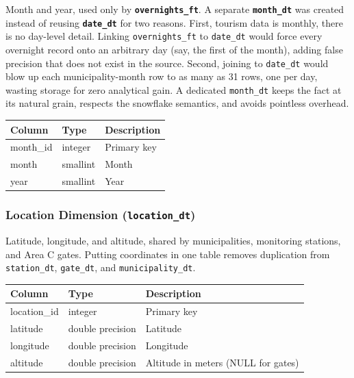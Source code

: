 \documentclass{article}
\begin{document}
	Month and year, used only by \textbf{\texttt{overnights\_ft}}.
	A separate \textbf{\texttt{month\_dt}} was created instead of reusing \textbf{\texttt{date\_dt}} for two reasons.
	First, tourism data is monthly, there is no day-level detail. Linking \texttt{overnights\_ft} to \texttt{date\_dt} would force every overnight record onto an arbitrary day (say, the first of the month), adding false precision that does not exist in the source.
	Second, joining to \texttt{date\_dt} would blow up each municipality-month row to as many as 31 rows, one per day, wasting storage for zero analytical gain.
	A dedicated \texttt{month\_dt} keeps the fact at its natural grain, respects the snowflake semantics, and avoids pointless overhead.

	\begin{table}[H]
		\centering
		\begin{tabular}{lll}
			\hline
			Column & Type & Description \\
			\hline
			month\_id & integer & Primary key \\
			month & smallint & Month \\
			year & smallint & Year \\
			\hline
		\end{tabular}
	\end{table}
	
	\subsubsection{Location Dimension (\textbf{\texttt{location\_dt}})}
	
	Latitude, longitude, and altitude, shared by municipalities, monitoring stations, and Area C gates. Putting coordinates in one table removes duplication from \texttt{station\_dt}, \texttt{gate\_dt}, and \texttt{municipality\_dt}.
	\begin{table}[H]
		\centering
		\begin{tabular}{lll}
			\hline
			Column & Type & Description \\
			\hline
			location\_id & integer & Primary key \\
			latitude & double precision & Latitude \\
			longitude & double precision & Longitude \\
			altitude & double precision & Altitude in meters (NULL for gates) \\
			\hline
		\end{tabular}
	\end{table}
	
\end{document}
